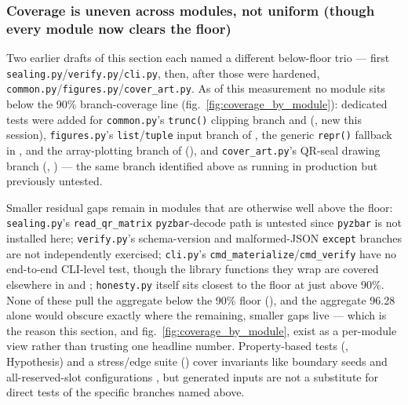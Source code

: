 \documentclass[
]{article}
\begin{document}
\subsubsection{Coverage is uneven across modules, not uniform (though
every module now clears the
floor)}\label{coverage-is-uneven-across-modules-not-uniform-though-every-module-now-clears-the-floor}

Two earlier drafts of this section each named a different below-floor
trio --- first \texttt{sealing.py}/\texttt{verify.py}/\texttt{cli.py},
then, after those were hardened,
\texttt{common.py}/\texttt{figures.py}/\texttt{cover\_art.py}. As of
this measurement no module sits below the 90\% branch-coverage line
(fig.~\ref{fig:coverage_by_module}): dedicated tests were added for
\texttt{common.py}'s \texttt{trunc()} clipping branch and
 (, new this
session), \texttt{figures.py}'s \texttt{list}/\texttt{tuple} input
branch of , the generic
\texttt{repr()} fallback in , and the
array-plotting branch of 
(), and \texttt{cover\_art.py}'s QR-seal
drawing branch (,
) --- the same
branch identified above as running in production but previously
untested.

Smaller residual gaps remain in modules that are otherwise well above
the floor: \texttt{sealing.py}'s \texttt{read\_qr\_matrix}
\texttt{pyzbar}-decode path is untested since \texttt{pyzbar} is not
installed here; \texttt{verify.py}'s schema-version and malformed-JSON
\texttt{except} branches are not independently exercised;
\texttt{cli.py}'s \texttt{cmd\_materialize}/\texttt{cmd\_verify} have no
end-to-end CLI-level test, though the library functions they wrap are
covered elsewhere in  and
; \texttt{honesty.py} itself
sits closest to the floor at just above 90\%. None of these pull the
aggregate below the 90\% floor (), and the
aggregate 96.28 alone would obscure exactly where the remaining, smaller
gaps live --- which is the reason this section, and
fig.~\ref{fig:coverage_by_module}, exist as a per-module view rather
than trusting one headline number. Property-based tests
(, Hypothesis) and a
stress/edge suite () cover
invariants like boundary seeds and all-reserved-slot configurations
\citep{claessen2000quickcheck, maciver2019hypothesis}, but generated
inputs are not a substitute for direct tests of the specific branches
named above.
\end{document}
